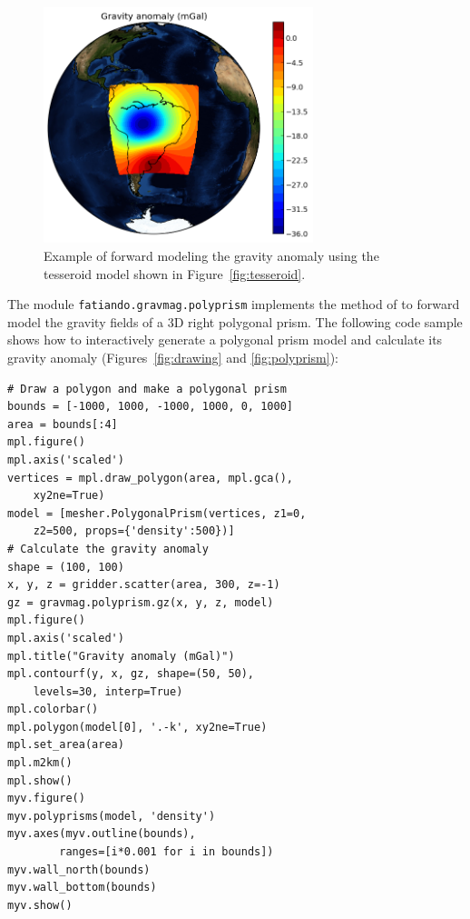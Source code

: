 \begin{figure}
    \centering
    \includegraphics[width=0.7\textwidth]{figures/paper1/gravmag_tesseroid_data}
    \caption{
        Example of forward modeling the gravity anomaly using the tesseroid
        model shown in Figure~\ref{fig:tesseroid}.
    }
    \label{fig:tesseroidgrav}
\end{figure}

The module \texttt{fatiando.gravmag.polyprism} implements the method of
\citet{plouff1976} to forward model the gravity fields of a 3D right polygonal
prism. The following code sample shows how to interactively generate a
polygonal prism model and calculate its gravity anomaly
(Figures~\ref{fig:drawing} and \ref{fig:polyprism}):

\begin{verbatim}
# Draw a polygon and make a polygonal prism
bounds = [-1000, 1000, -1000, 1000, 0, 1000]
area = bounds[:4]
mpl.figure()
mpl.axis('scaled')
vertices = mpl.draw_polygon(area, mpl.gca(),
    xy2ne=True)
model = [mesher.PolygonalPrism(vertices, z1=0,
    z2=500, props={'density':500})]
# Calculate the gravity anomaly
shape = (100, 100)
x, y, z = gridder.scatter(area, 300, z=-1)
gz = gravmag.polyprism.gz(x, y, z, model)
mpl.figure()
mpl.axis('scaled')
mpl.title("Gravity anomaly (mGal)")
mpl.contourf(y, x, gz, shape=(50, 50),
    levels=30, interp=True)
mpl.colorbar()
mpl.polygon(model[0], '.-k', xy2ne=True)
mpl.set_area(area)
mpl.m2km()
mpl.show()
myv.figure()
myv.polyprisms(model, 'density')
myv.axes(myv.outline(bounds),
        ranges=[i*0.001 for i in bounds])
myv.wall_north(bounds)
myv.wall_bottom(bounds)
myv.show()
\end{verbatim}

